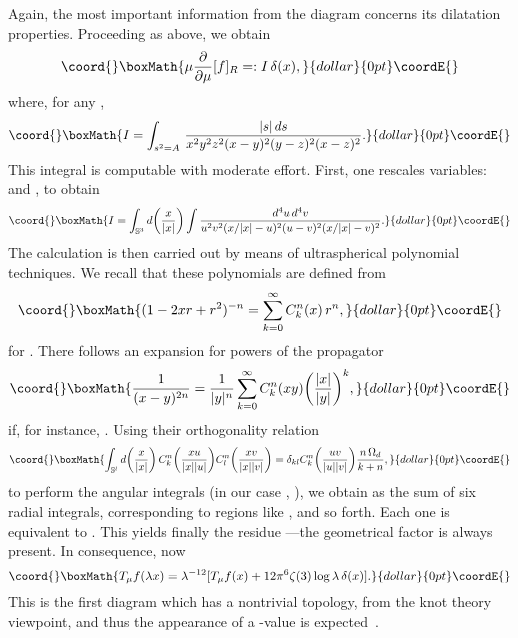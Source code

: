 \documentclass[a4paper,12pt]{article}
\providecommand{\del}{\partial}        %
\providecommand{\dl}{\delta}           %
\providecommand{\la}{\lambda}          %
\providecommand{\Sf}{\mathbb{S}}       %
\providecommand{\7}{\dagger}           %
\theoremstyle{plain}
\theoremstyle{definition}
\begin{document}
Again, the most important information from the diagram concerns its
dilatation properties. Proceeding as above, we obtain
$$\coord{}\boxMath{
\mu\frac{\del}{\del\mu} [f]_R =: I\,\dl(x),
}{dollar}{0pt}\coordE{}$$
where, for any \coordHE{},
$$\coord{}\boxMath{
I = \int_{s^2=A}\, \frac{|s|\,ds}{x^2 y^2 z^2 (x-y)^2 (y-z)^2 (x-z)^2}.
}{dollar}{0pt}\coordE{}$$
This integral is computable with moderate effort.
First, one rescales variables: \coordHE{} and \coordHE{}, to obtain
$$\coord{}\boxMath{
I = \int_{\Sf^3} d\biggl( \frac{x}{|x|} \biggr) \int
\frac{d^4u\,d^4v}{u^2v^2(x/|x|-u)^2(u-v)^2(x/|x|-v)^2}.
}{dollar}{0pt}\coordE{}$$
The calculation is then carried out by means of ultraspherical
polynomial~\cite{AAR, CKTk} techniques. We recall that these
polynomials are defined from
$$\coord{}\boxMath{
(1 - 2xr + r^2)^{-n} = \sum_{k=0}^\infty C^n_k(x)\,r^n,
}{dollar}{0pt}\coordE{}$$
for \coordHE{}. There follows an expansion for powers of the propagator
$$\coord{}\boxMath{
\frac{1}{(x-y)^{2n}} = \frac{1}{|y|^n} \sum_{k=0}^\infty C^n_k(xy)
\biggl( \frac{|x|}{|y|} \biggr)^k,
}{dollar}{0pt}\coordE{}$$
if, for instance, \coordHE{}. Using their orthogonality relation
$$\coord{}\boxMath{
\int_{\Sf^l} d\biggl(\frac{x}{|x|}\biggr)\,
C^n_k\biggl(\frac{xu}{|x||u|}\biggr)
C^n_l\biggl(\frac{xv}{|x||v|}\biggr) =
\dl_{kl} C^n_k\biggl(\frac{uv}{|u||v|}\biggr) \frac{n\,\Omega_d}{k+n},
}{dollar}{0pt}\coordE{}$$
to perform the angular integrals (in our case \coordHE{}, \coordHE{}), we
obtain \coordHE{} as the sum of six radial integrals, corresponding to
regions like \coordHE{}, and so forth. Each one is equivalent to
\coordHE{}. This yields finally the residue \coordHE{}
---the geometrical factor \coordHE{} is always present. In
consequence, now
$$\coord{}\boxMath{
T_\mu f(\la x) =
\la^{-12} [T_\mu f(x) + 12\pi^6\zeta(3) \log\la\, \dl(x)].
}{dollar}{0pt}\coordE{}$$
This is the first diagram which has a nontrivial topology, from the
knot theory viewpoint, and thus the appearance of a \myHighlight{$\zeta$}\coordHE{}-value is
expected~\cite{Dirkbook}.
\end{document}
